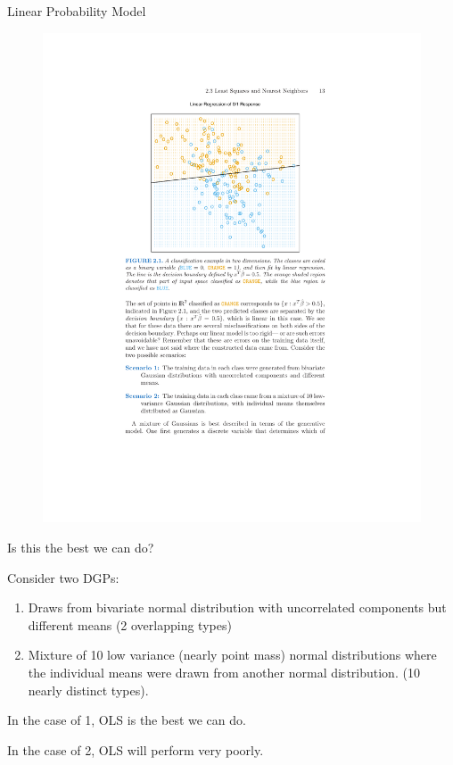\begin{frame}{Linear Probability Model}
  \vspace{-15pt}
    
  \begin{figure}[htbp]
  \begin{center}
  \includegraphics[height = .95\textheight]{./resources/classifierOLS.pdf}
  \label{classOLS}
  \end{center}
  \end{figure}
\end{frame}

\begin{frame}{Is this the best we can do?}

Consider two DGPs: 
\begin{enumerate}
  \item Draws from bivariate normal distribution with uncorrelated components but different means (2 overlapping types)
  \item Mixture of 10 low variance (nearly point mass) normal distributions where the individual means were drawn from another normal distribution. (10 nearly distinct types).
\end{enumerate}

In the case of 1, OLS is the best we can do. 

In the case of 2, OLS will perform very poorly.

\end{frame}


